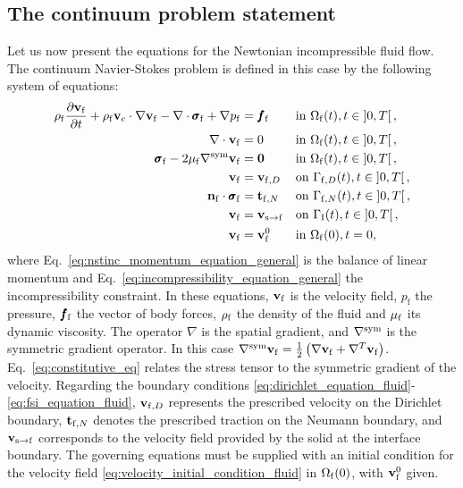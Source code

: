 \documentclass[11pt,english]{article}
\def\alevelocity{\vb{v}_{\mathrm{c}}}
\def\densfluid{\rho_{\rm{f}}}                %
\def\viscfluid{\mu_{\rm{f}}}                 %
\def\domainfluid{\Omega_{\rm{f}}}
\def\boundaryfluidD{\Gamma_{\mathrm{f},D}}
\def\boundaryfluidN{\Gamma_{\mathrm{f},N}}
\def\vfluid{\vb{v}_{\rm{f}}}               %
\def\vfluidD{\vb{v}_{{\rm{f}},D}}
\def\pfluid{p_{\mathrm{f}}}                %
\def\bodyffluid{\pmb{f}_{\rm{f}}}          %
\def\tfluidN{\vb{t}_{\mathrm{f},N}}
\def\nfluid{\vb{n}_{\mathrm{f}}}
\def\sigmafluid{\pmb{\sigma}_{\rm{f}}}
\def\boundaryFSI{\Gamma_{\rm{I}}}
\def\vboundaryFSI{\vb{v}_{\rm{s}\to{\rm{f}}}}
\def\timeint{\left ] 0,T\right[}                         %
\begin{document}
%
%
\subsection{The continuum problem statement\label{subsec:fluid_continuum}}

Let us now present the equations for the Newtonian incompressible fluid flow. The continuum Navier-Stokes problem is defined in this case by the following system of equations:
\begin{align}
    \densfluid\frac{\partial \vfluid}{\partial t} + \densfluid \alevelocity \cdot \nabla \vfluid  - \nabla \cdot  \sigmafluid + \nabla \pfluid &= \bodyffluid \quad &&\hbox{in}~\domainfluid(t) , t \in \timeint, \label{eq:nstinc_momentum_equation_general}\\
    \nabla \cdot \vfluid &= 0 \quad &&\hbox{in}~\domainfluid(t) , t \in \timeint, \label{eq:incompressibility_equation_general}\\
    \sigmafluid - 2\viscfluid \nabla^\mathrm{sym} \vfluid &= \textbf{0} \quad &&\hbox{in}~\domainfluid(t) , t \in \timeint, \label{eq:constitutive_eq}\\
    \vfluid&=\vfluidD  && \hbox{on} ~\boundaryfluidD(t), t \in \timeint, \label{eq:dirichlet_equation_fluid}\\
    \nfluid \cdot \sigmafluid&=\tfluidN   && \hbox{on}~  \boundaryfluidN(t), t \in \timeint, \label{eq:Neumann_equation_fluid}\\
    \vfluid&=\vboundaryFSI  && \hbox{on} ~\boundaryFSI(t), t \in \timeint, \label{eq:fsi_equation_fluid} \\
    \vfluid&= \vfluid^0 &&\hbox{in}~\domainfluid(0), t=0,\label{eq:velocity_initial_condition_fluid}
\end{align}
where Eq.~\eqref{eq:nstinc_momentum_equation_general} is the balance of linear momentum and Eq.~\eqref{eq:incompressibility_equation_general} the incompressibility constraint. In these equations, $\vfluid$ is the velocity field, $\pfluid$ the pressure, $\bodyffluid$ the vector of body forces, $\densfluid$ the density of the fluid and $\viscfluid$ its dynamic viscosity. The operator $\nabla$ is the spatial gradient, and $\nabla^{\rm{sym}}$ is the symmetric gradient operator. In this case $\nabla^{\rm{sym}} \vfluid = \frac{1}{2}\left(\nabla \vfluid + \nabla^T \vfluid \right)$. Eq.~\eqref{eq:constitutive_eq} relates the stress tensor to the symmetric gradient of the velocity. Regarding the boundary conditions \eqref{eq:dirichlet_equation_fluid}-\eqref{eq:fsi_equation_fluid}, $\vfluidD$ represents the prescribed velocity on the Dirichlet boundary, $\tfluidN $ denotes the prescribed traction on the Neumann boundary, and $\vboundaryFSI$ corresponds to the velocity field provided by the solid at the interface boundary. The governing equations must be supplied with an initial condition for the velocity field \eqref{eq:velocity_initial_condition_fluid} in $\domainfluid(0)$, with $\vfluid^0$ given. 
\end{document}
